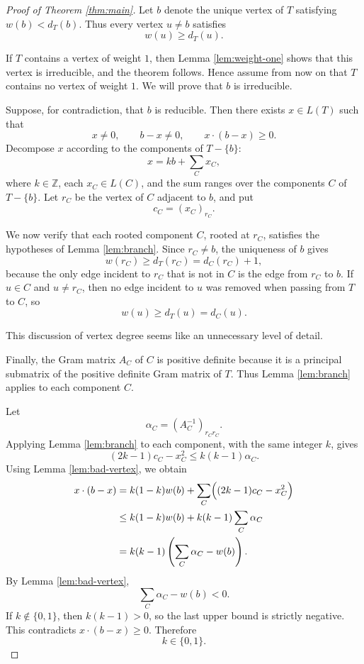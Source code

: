 \documentclass[12pt]{article}
\newcommand{\Z}{\mathbb{Z}}
\newcommand{\review}[1]{\begin{reviewbox}#1\end{reviewbox}}
\begin{document}
\begin{proof}[Proof of Theorem \ref{thm:main}]
Let \(b\) denote the unique vertex of \(T\) satisfying \(w(b)<d_T(b)\). Thus every vertex \(u\ne b\) satisfies
\[
w(u)\ge d_T(u).
\]

If \(T\) contains a vertex of weight \(1\), then Lemma \ref{lem:weight-one} shows that this vertex is irreducible, and the theorem follows. Hence assume from now on that \(T\) contains no vertex of weight \(1\). We will prove that \(b\) is irreducible.

Suppose, for contradiction, that \(b\) is reducible. Then there exists \(x\in L(T)\) such that
\[
x\ne 0,
\qquad
b-x\ne 0,
\qquad
x\cdot(b-x)\ge 0.
\]
Decompose \(x\) according to the components of \(T-\{b\}\):
\[
x=kb+\sum_C x_C,
\]
where \(k\in\Z\), each \(x_C\in L(C)\), and the sum ranges over the components \(C\) of \(T-\{b\}\). Let \(r_C\) be the vertex of \(C\) adjacent to \(b\), and put
\[
c_C=(x_C)_{r_C}.
\]

We now verify that each rooted component \(C\), rooted at \(r_C\), satisfies the hypotheses of Lemma \ref{lem:branch}. Since \(r_C\ne b\), the uniqueness of \(b\) gives
\[
w(r_C)\ge d_T(r_C)=d_C(r_C)+1,
\]
because the only edge incident to \(r_C\) that is not in \(C\) is the edge from \(r_C\) to \(b\). If \(u\in C\) and \(u\ne r_C\), then no edge incident to \(u\) was removed when passing from \(T\) to \(C\), so
\[
w(u)\ge d_T(u)=d_C(u).
\]
\review{This discussion of vertex degree seems like an unnecessary level of detail.}
Finally, the Gram matrix \(A_C\) of \(C\) is positive definite because it is a principal submatrix of the positive definite Gram matrix of \(T\). Thus Lemma \ref{lem:branch} applies to each component \(C\).

Let
\[
\alpha_C=(A_C^{-1})_{r_Cr_C}.
\]
Applying Lemma \ref{lem:branch} to each component, with the same integer \(k\), gives
\[
(2k-1)c_C-x_C^2\le k(k-1)\alpha_C.
\]
Using Lemma \ref{lem:bad-vertex}, we obtain
\[
\begin{aligned}
x\cdot(b-x)
&=
k(1-k)w(b)
+
\sum_C\Bigl((2k-1)c_C-x_C^2\Bigr)\\
&\le
k(1-k)w(b)+k(k-1)\sum_C\alpha_C\\
&=
k(k-1)\left(\sum_C\alpha_C-w(b)\right).
\end{aligned}
\]
By Lemma \ref{lem:bad-vertex},
\[
\sum_C\alpha_C-w(b)<0.
\]
If \(k\notin\{0,1\}\), then \(k(k-1)>0\), so the last upper bound is strictly negative. This contradicts \(x\cdot(b-x)\ge 0\). Therefore
\[
k\in\{0,1\}.
\]


\end{proof}
\end{document}
